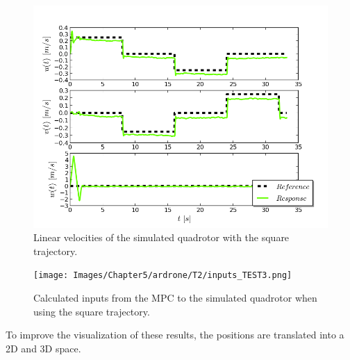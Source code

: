\begin{figure}[H]
\centering
\includegraphics[scale=0.7]{Images/Chapter5/ardrone/T2/velocity.png}
\caption{Linear velocities of the simulated quadrotor with the square trajectory.}
\label{fig:ardrone_sq_vel}
\end{figure}

\begin{figure}[H]    
\centering
\texttt{[image: Images/Chapter5/ardrone/T2/inputs\_TEST3.png]}
\caption{Calculated inputs from the MPC to the simulated quadrotor when using the square trajectory. }
\label{fig:ardrone_sq_inp}
\end{figure}

To improve the visualization of these results, the positions are translated into a 2D and 3D space. 

